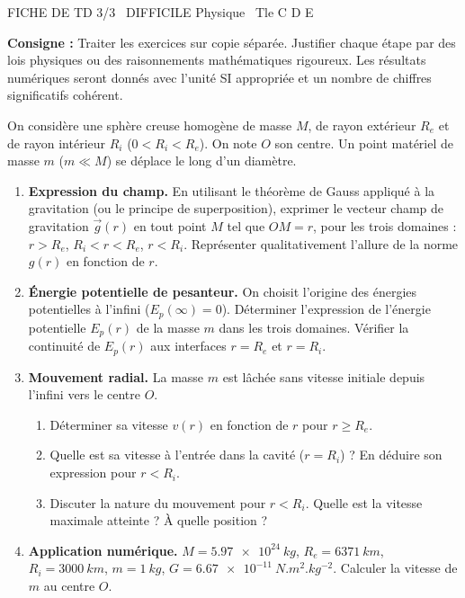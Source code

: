 \documentclass[11pt]{article}
\begin{document}
\begin{tcolorbox}[enhanced,colback=popink,colframe=popink,arc=10pt,boxrule=0pt,left=12pt,right=12pt,top=9pt,bottom=9pt]
{\color{white}\popxbold\small FICHE DE TD 3/3 \textbullet\ DIFFICILE \hfill Physique \textbullet\ Tle C D E\par}
\end{tcolorbox}
\vspace{4pt}
\noindent \textbf{Consigne :} Traiter les exercices sur copie séparée. Justifier chaque étape par des lois physiques ou des raisonnements mathématiques rigoureux. Les résultats numériques seront donnés avec l'unité SI appropriée et un nombre de chiffres significatifs cohérent.

\begin{exercice}
On considère une sphère creuse homogène de masse $M$, de rayon extérieur $R_e$ et de rayon intérieur $R_i$ ($0 < R_i < R_e$). On note $O$ son centre. Un point matériel de masse $m$ ($m \ll M$) se déplace le long d'un diamètre.
\begin{enumerate}
    \item \textbf{Expression du champ.} En utilisant le théorème de Gauss appliqué à la gravitation (ou le principe de superposition), exprimer le vecteur champ de gravitation $\vec{g}(r)$ en tout point $M$ tel que $OM = r$, pour les trois domaines : $r > R_e$, $R_i < r < R_e$, $r < R_i$. Représenter qualitativement l'allure de la norme $g(r)$ en fonction de $r$.
    \item \textbf{Énergie potentielle de pesanteur.} On choisit l'origine des énergies potentielles à l'infini ($E_p(\infty)=0$). Déterminer l'expression de l'énergie potentielle $E_p(r)$ de la masse $m$ dans les trois domaines. Vérifier la continuité de $E_p(r)$ aux interfaces $r=R_e$ et $r=R_i$.
    \item \textbf{Mouvement radial.} La masse $m$ est lâchée sans vitesse initiale depuis l'infini vers le centre $O$.
    \begin{enumerate}
        \item Déterminer sa vitesse $v(r)$ en fonction de $r$ pour $r \ge R_e$.
        \item Quelle est sa vitesse à l'entrée dans la cavité ($r=R_i$) ? En déduire son expression pour $r < R_i$.
        \item Discuter la nature du mouvement pour $r < R_i$. Quelle est la vitesse maximale atteinte ? À quelle position ?
    \end{enumerate}
    \item \textbf{Application numérique.} $M = \SI{5,97e24}{kg}$, $R_e = \SI{6371}{km}$, $R_i = \SI{3000}{km}$, $m = \SI{1}{kg}$, $G = \SI{6,67e-11}{N.m^2.kg^{-2}}$. Calculer la vitesse de $m$ au centre $O$.
\end{enumerate}
\end{exercice}
\end{document}
